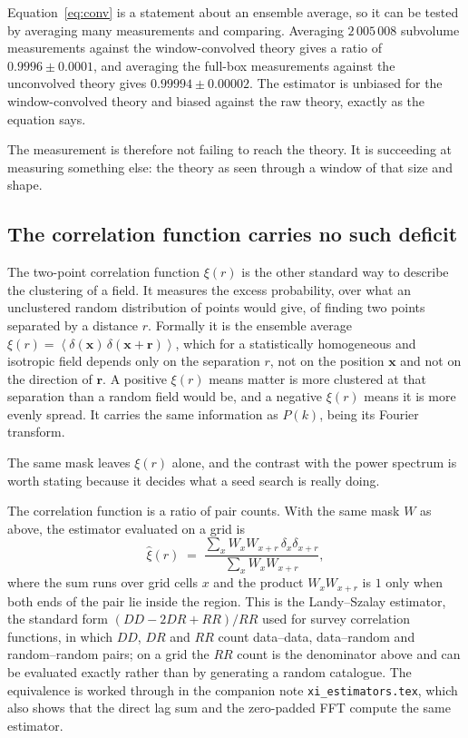 \documentclass[12pt]{article}
\newcommand{\bx}{\mathbf{x}}
\newcommand{\avg}[1]{\left\langle #1 \right\rangle}
\begin{document}
Equation~\eqref{eq:conv} is a statement about an ensemble average, so it can be
tested by averaging many measurements and comparing. Averaging $2\,005\,008$
subvolume measurements against the window-convolved theory gives a ratio of
$0.9996 \pm 0.0001$, and averaging the full-box measurements against the
unconvolved theory gives $0.99994 \pm 0.00002$. The estimator is unbiased for
the window-convolved theory and biased against the raw theory, exactly as the
equation
says.

The measurement is therefore not failing to reach the theory. It is succeeding
at measuring something else: the theory as seen through a window of that size
and shape.

\subsection{The correlation function carries no such deficit}
\label{sec:xi-unbiased}

The two-point correlation function $\xi(r)$ is the other standard way to
describe the clustering of a field. It measures the excess probability, over
what an unclustered random distribution of points would give, of finding two
points separated by a distance $r$. Formally it is the ensemble average
$\xi(r) = \avg{\delta(\bx)\,\delta(\bx + \mathbf{r})}$, which for a
statistically homogeneous and isotropic field depends only on the separation
$r$, not on the position $\bx$ and not on the direction of $\mathbf{r}$. A
positive $\xi(r)$ means matter is more clustered at that separation than a
random field would be, and a negative $\xi(r)$ means it is more evenly spread.
It carries the same information as $P(k)$, being its Fourier transform.

The same mask leaves $\xi(r)$ alone, and the contrast with the power spectrum is
worth stating because it decides what a seed search is really doing.

The correlation function is a ratio of pair counts. With the same mask $W$ as
above, the estimator evaluated on a grid is
\begin{equation}
  \label{eq:xi-est}
  \hat\xi(r) \;=\;
  \frac{\sum_x W_x W_{x+r}\, \delta_x \delta_{x+r}}
       {\sum_x W_x W_{x+r}} ,
\end{equation}
where the sum runs over grid cells $x$ and the product $W_x W_{x+r}$ is $1$ only
when both ends of the pair lie inside the region. This is the Landy--Szalay
estimator, the standard form $(DD - 2DR + RR)/RR$ used for survey correlation
functions, in which $DD$, $DR$ and $RR$ count data--data, data--random and
random--random pairs; on a grid the $RR$ count is the denominator above and can
be evaluated exactly rather than by generating a random catalogue. The
equivalence is worked through in the companion note
\texttt{xi\_estimators.tex}, which also shows that the direct lag sum and the
zero-padded FFT compute the same estimator.
\end{document}
